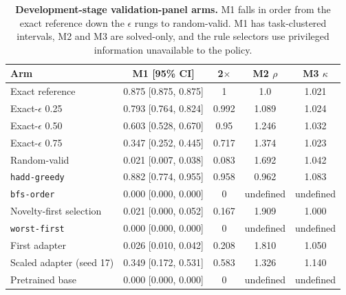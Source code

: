 \begin{table}[t]
\caption{\textbf{Development-stage validation-panel arms.} M1 falls in order from the exact reference down the $\epsilon$ rungs to random-valid. M1 has task-clustered intervals, M2 and M3 are solved-only, and the rule selectors use privileged information unavailable to the policy.}
\label{tab:appendix-ladder-arms}
\centering\footnotesize
\setlength{\tabcolsep}{2.5pt}
\begin{tabular}{lcccc}
\toprule[0.4mm]
\rowcolor{mygray}\textbf{Arm} & \textbf{M1 [95\% CI]} & \textbf{2$\times$} & \textbf{M2 $\rho$} & \textbf{M3 $\kappa$} \\
\midrule
Exact reference & 0.875 [0.875, 0.875] & 1 & 1.0 & 1.021 \\
Exact-$\epsilon$ 0.25 & 0.793 [0.764, 0.824] & 0.992 & 1.089 & 1.024 \\
Exact-$\epsilon$ 0.50 & 0.603 [0.528, 0.670] & 0.95 & 1.246 & 1.032 \\
Exact-$\epsilon$ 0.75 & 0.347 [0.252, 0.445] & 0.717 & 1.374 & 1.023 \\
Random-valid & 0.021 [0.007, 0.038] & 0.083 & 1.692 & 1.042 \\
\midrule
\texttt{hadd-greedy} & 0.882 [0.774, 0.955] & 0.958 & 0.962 & 1.083 \\
\texttt{bfs-order} & 0.000 [0.000, 0.000] & 0 & undefined & undefined \\
Novelty-first selection & 0.021 [0.000, 0.052] & 0.167 & 1.909 & 1.000 \\
\texttt{worst-first} & 0.000 [0.000, 0.000] & 0 & undefined & undefined \\
\midrule
First adapter & 0.026 [0.010, 0.042] & 0.208 & 1.810 & 1.050 \\
Scaled adapter (seed 17) & 0.349 [0.172, 0.531] & 0.583 & 1.326 & 1.140 \\
Pretrained base & 0.000 [0.000, 0.000] & 0 & undefined & undefined \\
\bottomrule
\end{tabular}
\end{table}

